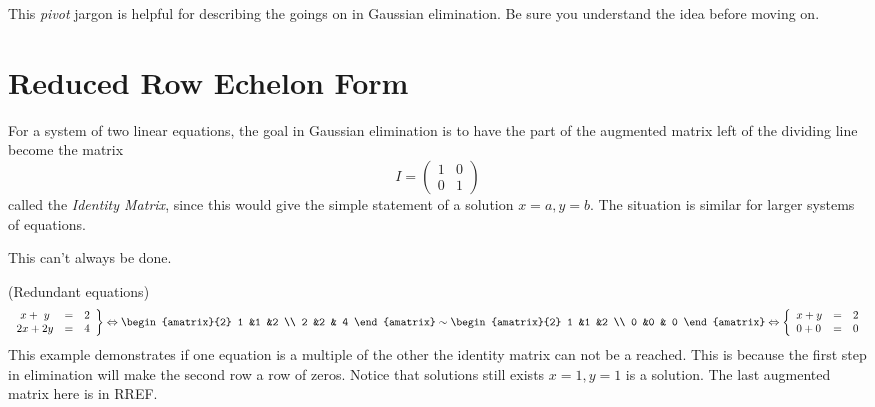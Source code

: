 This {\itshape pivot} jargon is helpful for describing the goings on in Gaussian elimination. Be sure you understand the idea before moving on. 


\section{Reduced Row Echelon Form}
For a system of two linear  equations, the goal in Gaussian elimination is to have the part of the augmented matrix left of the dividing line become the matrix
 \[I=    \begin{pmatrix}
      1             &0  \\
      0             &1
    \end{pmatrix}\] 
called the \emph{Identity Matrix}, since this would give the simple statement of a solution $x=a,y=b$. The situation is similar for larger systems of equations.



\noindent
This can't always be done.

\begin{example} (Redundant equations)
\[
   \left.
\begin{array}{lcr}
	\ x + \ y & = & 2 \\
	2x + 2y & = &  4
     \end{array}
   \right\} 
   \Leftrightarrow
\begin{amatrix}{2}
1 &1 &2 \\ 2 &2 & 4
\end{amatrix}
\sim
\begin{amatrix}{2}
1 &1 &2 \\ 0 &0 & 0
\end{amatrix}
\Leftrightarrow
\left\{
\begin{array}{lcr}
	x + y & = & 2 \\
	 0 + 0 & = &  0
     \end{array}
   \right.
\]
This example demonstrates if one equation is a multiple of the other the identity matrix can not be a reached. This is because the first step in elimination will make the second row a row of zeros. Notice that solutions still exists $x=1,y=1$ is a solution. The last augmented matrix here is in RREF.
\end{example}

